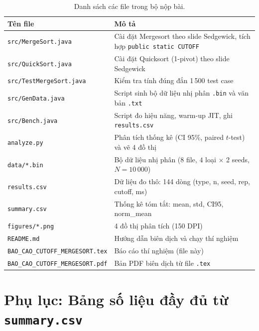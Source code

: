 \documentclass[12pt, a4paper]{article}
\begin{document}
\begin{table}[H]
\centering
\caption{Danh sách các file trong bộ nộp bài.}
\label{tab:files}
\renewcommand{\arraystretch}{1.3}
\begin{tabular}{lp{9cm}}
\toprule
\textbf{Tên file} & \textbf{Mô tả} \\
\midrule
\rowcolor{rowodd}  \texttt{src/MergeSort.java}        & Cài đặt Mergesort theo slide Sedgewick, tích hợp \texttt{public static CUTOFF} \\
\rowcolor{roweven} \texttt{src/QuickSort.java}         & Cài đặt Quicksort (1-pivot) theo slide Sedgewick \\
\rowcolor{rowodd}  \texttt{src/TestMergeSort.java}     & Kiểm tra tính đúng đắn 1\,500 test case \\
\rowcolor{roweven} \texttt{src/GenData.java}           & Script sinh bộ dữ liệu nhị phân \texttt{.bin} và văn bản \texttt{.txt} \\
\rowcolor{rowodd}  \texttt{src/Bench.java}             & Script đo hiệu năng, warm-up JIT, ghi \texttt{results.csv} \\
\rowcolor{roweven} \texttt{analyze.py}                 & Phân tích thống kê (CI 95\%, paired $t$-test) và vẽ 4 đồ thị \\
\rowcolor{rowodd}  \texttt{data/*.bin}                 & Bộ dữ liệu nhị phân (8 file, $4$ loại $\times$ 2 seeds, $N = 10\,000$) \\
\rowcolor{roweven} \texttt{results.csv}                & Dữ liệu đo thô: 144 dòng (type, n, seed, rep, cutoff, ms) \\
\rowcolor{rowodd}  \texttt{summary.csv}                & Thống kê tóm tắt: mean, std, CI95, norm\_mean \\
\rowcolor{roweven} \texttt{figures/*.png}              & 4 đồ thị phân tích (150 DPI) \\
\rowcolor{rowodd}  \texttt{README.md}                  & Hướng dẫn biên dịch và chạy thí nghiệm \\
\rowcolor{roweven} \texttt{BAO\_CAO\_CUTOFF\_MERGESORT.tex}  & Báo cáo thí nghiệm (file này) \\
\rowcolor{rowodd}  \texttt{BAO\_CAO\_CUTOFF\_MERGESORT.pdf}  & Bản PDF biên dịch từ file \texttt{.tex} \\
\bottomrule
\end{tabular}
\end{table}

\section{Phụ lục: Bảng số liệu đầy đủ từ \texttt{summary.csv}}
\end{document}

